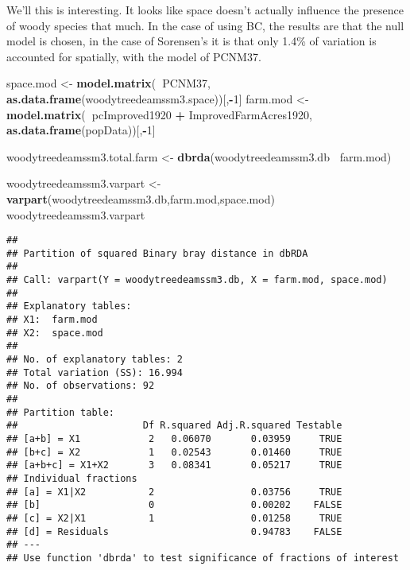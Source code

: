\documentclass[
]{article}
\newenvironment{Shaded}{\begin{snugshade}}{\end{snugshade}}
\newcommand{\DecValTok}[1]{\textcolor[rgb]{0.00,0.00,0.81}{#1}}
\newcommand{\KeywordTok}[1]{\textcolor[rgb]{0.13,0.29,0.53}{\textbf{#1}}}
\newcommand{\NormalTok}[1]{#1}
\newcommand{\OperatorTok}[1]{\textcolor[rgb]{0.81,0.36,0.00}{\textbf{#1}}}
\newcommand{\StringTok}[1]{\textcolor[rgb]{0.31,0.60,0.02}{#1}}
\begin{document}
We'll this is interesting. It looks like space doesn't actually
influence the presence of woody species that much. In the case of using
BC, the results are that the null model is chosen, in the case of
Sorensen's it is that only 1.4\% of variation is accounted for
spatially, with the model of PCNM37.

\begin{Shaded}
\begin{Highlighting}[]
\NormalTok{space.mod <-}\StringTok{ }\KeywordTok{model.matrix}\NormalTok{(}\OperatorTok{~}\NormalTok{PCNM37, }\KeywordTok{as.data.frame}\NormalTok{(woodytreedeamssm3.space))[,}\OperatorTok{-}\DecValTok{1}\NormalTok{]}
\NormalTok{farm.mod <-}\StringTok{ }\KeywordTok{model.matrix}\NormalTok{(}\OperatorTok{~}\NormalTok{pcImproved1920 }\OperatorTok{+}\StringTok{ }\NormalTok{ImprovedFarmAcres1920, }\KeywordTok{as.data.frame}\NormalTok{(popData))[,}\OperatorTok{-}\DecValTok{1}\NormalTok{]}
\end{Highlighting}
\end{Shaded}

\begin{Shaded}
\begin{Highlighting}[]
\NormalTok{woodytreedeamssm3.total.farm <-}\StringTok{ }\KeywordTok{dbrda}\NormalTok{(woodytreedeamssm3.db }\OperatorTok{~}\NormalTok{farm.mod)}
\end{Highlighting}
\end{Shaded}

\begin{Shaded}
\begin{Highlighting}[]
\NormalTok{woodytreedeamssm3.varpart <-}\StringTok{ }\KeywordTok{varpart}\NormalTok{(woodytreedeamssm3.db,farm.mod,space.mod)}
\NormalTok{woodytreedeamssm3.varpart}
\end{Highlighting}
\end{Shaded}

\begin{verbatim}
## 
## Partition of squared Binary bray distance in dbRDA 
## 
## Call: varpart(Y = woodytreedeamssm3.db, X = farm.mod, space.mod)
## 
## Explanatory tables:
## X1:  farm.mod
## X2:  space.mod 
## 
## No. of explanatory tables: 2 
## Total variation (SS): 16.994 
## No. of observations: 92 
## 
## Partition table:
##                      Df R.squared Adj.R.squared Testable
## [a+b] = X1            2   0.06070       0.03959     TRUE
## [b+c] = X2            1   0.02543       0.01460     TRUE
## [a+b+c] = X1+X2       3   0.08341       0.05217     TRUE
## Individual fractions                                    
## [a] = X1|X2           2                 0.03756     TRUE
## [b]                   0                 0.00202    FALSE
## [c] = X2|X1           1                 0.01258     TRUE
## [d] = Residuals                         0.94783    FALSE
## ---
## Use function 'dbrda' to test significance of fractions of interest
\end{verbatim}
\end{document}
